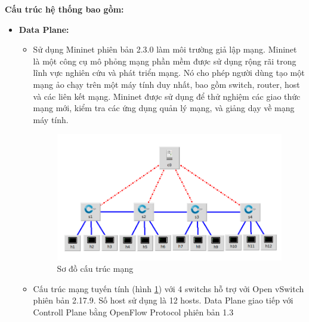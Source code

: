 \documentclass[a4paper]{article}
\begin{document}
\textbf{Cấu trúc hệ thống bao gồm: }
\begin{itemize}
    \item \textbf{Data Plane: }
    \begin{itemize}[label={}]
        \item Sử dụng Mininet\cite{mininet} phiên bản 2.3.0 làm môi trường giả lập mạng. Mininet là một công cụ mô phỏng mạng phần mềm được sử dụng rộng rãi trong lĩnh vực nghiên cứu và phát triển mạng. Nó cho phép người dùng tạo một mạng ảo chạy trên một máy tính duy nhất, bao gồm switch, router, host và các liên kết mạng. Mininet được sử dụng để thử nghiệm các giao thức mạng mới, kiểm tra các ứng dụng quản lý mạng, và giảng dạy về mạng máy tính.
        \begin{figure}
                \centering
                \includegraphics[width=1\linewidth]{images//result/topo.png}
                \caption{Sơ đồ cấu trúc mạng}
                \label{fig:topo}
            \end{figure}    
        \item Cấu trúc mạng tuyến tính (hình \ref{fig:topo}) với 4 switchs hỗ trợ vởi Open vSwitch\cite{OpenvSwitch} phiên bản 2.17.9. Số host sử dụng là 12 hosts. Data Plane giao tiếp với Controll Plane bằng OpenFlow Protocol phiên bản 1.3
    \end{itemize}
    

\end{itemize}
\end{document}
